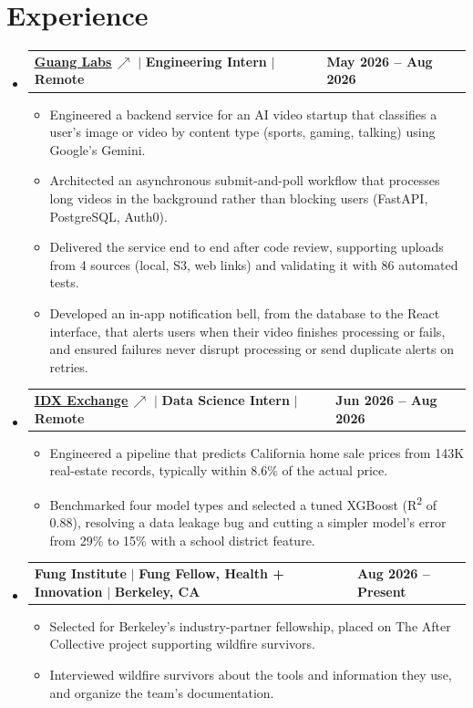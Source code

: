 \documentclass[letterpaper,11pt]{article}
\makeatletter
\newcommand{\resumeItem}[1]{%
  \item\small{{#1\vspace{-2pt}}}%
}
\newcommand{\resumeCompactHeading}[4]{
  \vspace{-1pt}\item
    \begin{tabularx}{1.0\textwidth}[t]{@{}X@{}>{\raggedright\arraybackslash}p{1.5in}@{}}
      \textbf{#1} $|$ \textbf{#2} $|$ \textbf{\small #3} & \textbf{\small #4} \\
    \end{tabularx}\vspace{-3pt}
}
\newcommand{\lk}{\,{\scriptsize$\nearrow$}}
\newcommand{\resumeSubHeadingListStart}{\begin{itemize}[leftmargin=0.0in, label={}]}
\newcommand{\resumeSubHeadingListEnd}{\end{itemize}}
\newcommand{\resumeItemListStart}{\begin{itemize}[itemsep=2.5pt, topsep=3pt]}
\newcommand{\resumeItemListEnd}{\end{itemize}\vspace{-4pt}}
\makeatother
\begin{document}
\section{Experience}
  \resumeSubHeadingListStart

    \resumeCompactHeading
        {\href{https://guanglabs.com/}{\uline{Guang Labs}}\lk}{Engineering Intern}{Remote}{May 2026 -- Aug 2026}
        \resumeItemListStart
             \resumeItem{Engineered a backend service for an AI video startup that classifies a user's image or video by content type (sports, gaming, talking) using Google's Gemini.}
             \resumeItem{Architected an asynchronous submit-and-poll workflow that processes long videos in the background rather than blocking users (FastAPI, PostgreSQL, Auth0).}
             \resumeItem{Delivered the service end to end after code review, supporting uploads from 4 sources (local, S3, web links) and validating it with 86 automated tests.}
             \resumeItem{Developed an in-app notification bell, from the database to the React interface, that alerts users when their video finishes processing or fails, and ensured failures never disrupt processing or send duplicate alerts on retries.}
        \resumeItemListEnd

    \resumeCompactHeading
        {\href{https://idxexchange.com/}{\uline{IDX Exchange}}\lk}{Data Science Intern}{Remote}{Jun 2026 -- Aug 2026}
        \resumeItemListStart
            \resumeItem{Engineered a pipeline that predicts California home sale prices from 143K real-estate records, typically within 8.6\% of the actual price.}
            \resumeItem{Benchmarked four model types and selected a tuned XGBoost (R\textsuperscript{2} of 0.88), resolving a data leakage bug and cutting a simpler model's error from 29\% to 15\% with a school district feature.}
        \resumeItemListEnd

    \resumeCompactHeading
        {Fung Institute}{Fung Fellow, Health + Innovation}{Berkeley, CA}{Aug 2026 -- Present}
        \resumeItemListStart
            \resumeItem{Selected for Berkeley's industry-partner fellowship, placed on The After Collective project supporting wildfire survivors.}
            \resumeItem{Interviewed wildfire survivors about the tools and information they use, and organize the team's documentation.}
        \resumeItemListEnd

  \resumeSubHeadingListEnd
\vspace{-12pt}

\end{document}
